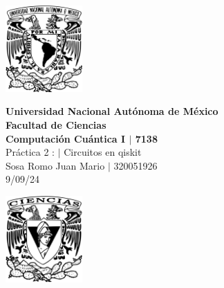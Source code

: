 \begin{center}
    \begin{minipage}{3cm}
    	\begin{center}
    		\includegraphics[height=3.3cm]{src/Img/Logo_UNAM.png}
    	\end{center}
    \end{minipage}\hfill
    \begin{minipage}{10cm}
    	\begin{center}
    	\textbf{\large Universidad Nacional Autónoma de México}\\[0.1cm]
        \textbf{Facultad de Ciencias}\\[0.1cm]
        \textbf{Computación Cuántica I $|$ 7138}\\[0.1cm]
        Práctica 2 : $|$ Circuitos en qiskit \\[0.1cm]
        Sosa Romo Juan Mario $|$ 320051926 \\[0.1cm]
        9/09/24
    	\end{center}
    \end{minipage}\hfill
    \begin{minipage}{3cm}
    	\begin{center}
    		\includegraphics[height=3.3cm]{src/Img/Logo_FC.png}
    	\end{center}
    \end{minipage}
\end{center}

